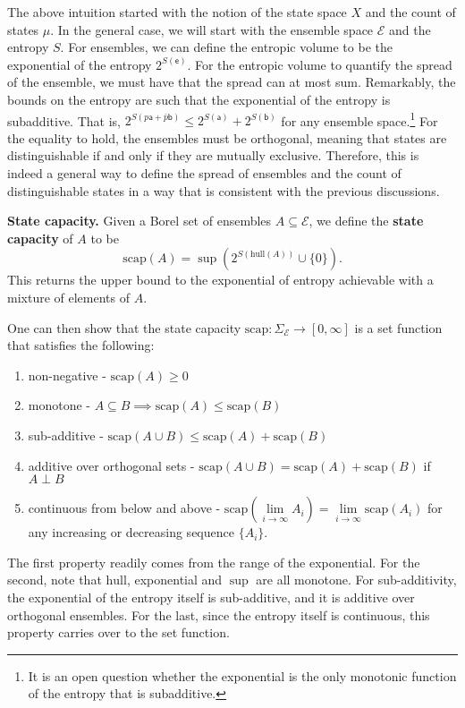 \documentclass[10pt,twocolumn, nofootinbib]{revtex4-2}
\newcommand\hull{\mathrm{hull}}
\newcommand\capacity{\mathrm{scap}}
\newcommand{\ens}[1][e] {\mathsf{#1}} %
\newcommand{\Ens}[1][E] {\mathcal{#1}} %
\def\ortho{\perp}
\begin{document}
The above intuition started with the notion of the state space $X$ and the count of states $\mu$. In the general case, we will start with the ensemble space $\Ens$ and the entropy $S$. For ensembles, we can define the entropic volume to be the exponential of the entropy $2^{S(\ens)}$. For the entropic volume to quantify the spread of the ensemble, we must have that the spread can at most sum. Remarkably, the bounds on the entropy are such that the exponential of the entropy is subadditive. That is, $2^{S(p\ens[a]+\bar{p}\ens[b])} \leq 2^{S(\ens[a])} + 2^{S(\ens[b])}$ for any ensemble space.\footnote{It is an open question whether the exponential is the only monotonic function of the entropy that is subadditive.} For the equality to hold, the ensembles must be orthogonal, meaning that states are distinguishable if and only if they are mutually exclusive. Therefore, this is indeed a general way to define the spread of ensembles and the count of distinguishable states in a way that is consistent with the previous discussions.

\textbf{State capacity.} Given a Borel set of ensembles $A \subseteq \Ens$, we define the \textbf{state capacity} of $A$ to be
\begin{equation}
\capacity(A) = \sup(2^{S(\hull(A))}\cup\{0\}).
\end{equation}
This returns the upper bound to the exponential of entropy achievable with a mixture of elements of $A$.

One can then show that the state capacity $\capacity : \Sigma_{\Ens} \to [0,\infty]$ is a set function that satisfies the following:
\begin{enumerate}
	\item non-negative - $\capacity(A)\geq 0$
	\item monotone - $A \subseteq B \implies \capacity(A) \leq \capacity(B)$
	\item sub-additive - $\capacity(A \cup B) \leq \capacity(A) + \capacity(B)$
	\item additive over orthogonal sets - $\capacity(A \cup B) = \capacity(A) + \capacity(B)$ if $A \ortho B$
	\item continuous from below and above - $\capacity(\lim\limits_{i \to \infty} A_i) = \lim\limits_{i \to \infty} \capacity(A_i)$ for any increasing or decreasing sequence $\{A_i\}$.
\end{enumerate}

The first property readily comes from the range of the exponential. For the second, note that $\hull$, exponential and $\sup$ are all monotone. For sub-additivity, the exponential of the entropy itself is sub-additive, and it is additive over orthogonal ensembles. For the last, since the entropy itself  is continuous, this property carries over to the set function.
\end{document}
